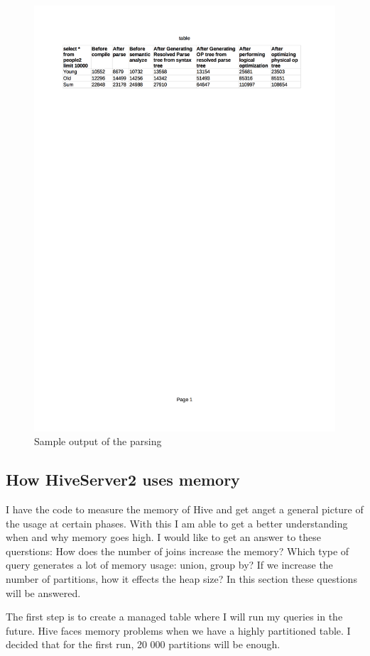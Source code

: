 \begin{figure}[H]
	\includegraphics[width=150mm, keepaspectratio]{figures/parse_output.png}
	\centering
	\caption{Sample output of the parsing}
\end{figure}


\subsection{How HiveServer2 uses memory}
I have the code to measure the memory of Hive and get anget a general picture of the usage at certain phases. With this I am able to get a better understanding when and why memory goes high. I would like to get an answer to these querstions: How does the number of joins increase the memory? Which type of query generates a lot of memory usage: union, group by? If we increase the number of partitions, how it effects the heap size? In this section these questions will be answered.

The first step is to create a managed table where I will run my queries in the future. Hive faces memory problems when we have a highly partitioned table. I decided that for the first run, 20 000 partitions will be enough. 


